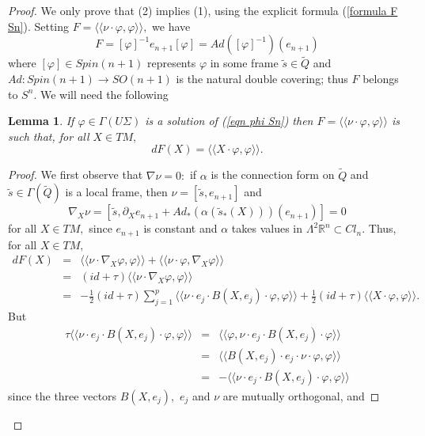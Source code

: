 \documentclass{amsart}
\newtheorem{lem}{Lemma}[section]
\begin{document}
\begin{proof}
We only prove that (2) implies (1), using the explicit formula (\ref{formula F Sn}). Setting $F=\langle\langle\nu\cdot\varphi,\varphi\rangle\rangle,$ we have 
$$F= [\varphi]^{-1} e_{n+1} [\varphi]=Ad([\varphi]^{-1})(e_{n+1})$$ 
where $[\varphi]\in Spin(n+1)$ represents $\varphi$ in some frame $\tilde{s}\in\tilde{Q}$ and $Ad:Spin(n+1)\rightarrow SO(n+1)$ is the natural double covering; thus $F$ belongs to $S^n.$ We will need the following
\begin{lem}\label{lem dF Sn}
If $\varphi\in \Gamma(U\Sigma)$ is a solution of (\ref{eqn phi Sn}) then $F=\langle\langle\nu\cdot\varphi,\varphi\rangle\rangle$ is such that, for all $X\in TM,$ 
\begin{equation}\label{dF Sn}
dF(X)=\langle\langle X\cdot\varphi,\varphi\rangle\rangle.
\end{equation}
\end{lem}
\begin{proof}
We first observe that $\nabla\nu=0:$ if $\alpha$ is the connection form on $\tilde{Q}$ and $\tilde{s}\in \Gamma(\tilde{Q})$ is a local frame, then $\nu=[\tilde{s},e_{n+1}]$ and 
$$\nabla_X\nu=[\tilde{s},\partial_Xe_{n+1}+Ad_*(\alpha(\tilde{s}_*(X)))(e_{n+1})]=0$$ 
for all $X\in TM,$ since $e_{n+1}$ is constant and $\alpha$ takes values in $\Lambda^2{\mathbb{R}}^n\subset Cl_n$. Thus, for all $X\in TM,$
\begin{eqnarray*}
dF(X)&=&\langle\langle \nu\cdot\nabla_X\varphi,\varphi\rangle\rangle+\langle\langle \nu\cdot\varphi,\nabla_X\varphi\rangle\rangle\\
&=&(id+\tau)\langle\langle \nu\cdot\nabla_X\varphi,\varphi\rangle\rangle\\
&=&-\frac{1}{2}(id+\tau)\sum_{j=1}^p\langle\langle \nu\cdot e_j\cdot B(X,e_j)\cdot\varphi,\varphi\rangle\rangle+\frac{1}{2}(id+\tau)\langle\langle X\cdot\varphi,\varphi\rangle\rangle.
\end{eqnarray*}
But
\begin{eqnarray*}
\tau\langle\langle \nu\cdot e_j\cdot B(X,e_j)\cdot\varphi,\varphi\rangle\rangle&=&\langle\langle \varphi,\nu\cdot e_j\cdot B(X,e_j)\cdot\varphi\rangle\rangle\\
&=&\langle\langle B(X,e_j)\cdot e_j\cdot \nu\cdot\varphi,\varphi\rangle\rangle\\
&=&-\langle\langle \nu\cdot e_j\cdot B(X,e_j)\cdot\varphi,\varphi\rangle\rangle
\end{eqnarray*}
since the three vectors $B(X,e_j),$ $e_j$ and  $\nu$ are mutually orthogonal, and

\end{proof}
\end{proof}
\end{document}
